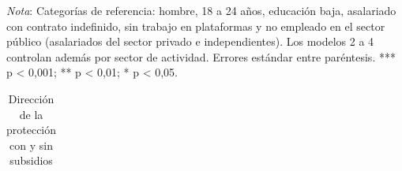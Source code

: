 \documentclass[
  spanish,
  12pt,
]{article}
\begin{document}
\emph{Nota}: Categorías de referencia: hombre, 18 a 24 años, educación
baja, asalariado con contrato indefinido, sin trabajo en plataformas y
no empleado en el sector público (asalariados del sector privado e
independientes). Los modelos 2 a 4 controlan además por sector de
actividad. Errores estándar entre paréntesis. *** p \textless{} 0,001;
** p \textless{} 0,01; * p \textless{} 0,05.

{

\begin{longtable}[]{@{}
  >{\raggedright\arraybackslash}p{}
  >{\centering\arraybackslash}p{}
  >{\centering\arraybackslash}p{}@{}}

\caption{\label{tbl-a-sin-subsidios}Dirección de la protección con y sin
subsidios}

\tabularnewline


\end{longtable}}
\end{document}
